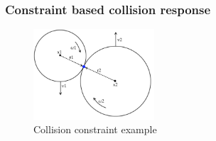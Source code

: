 \documentclass[a4paper]{article}
\begin{document}
\subsubsection{Constraint based collision response}

\begin{figure}[h!]
  \centering
  \includegraphics[width=0.4\textwidth]{graphics/collision_constraint_example.eps}
  \caption{Collision constraint example}
  \label{fig:collision_constraint_example}
\end{figure}
\FloatBarrier
\end{document}
